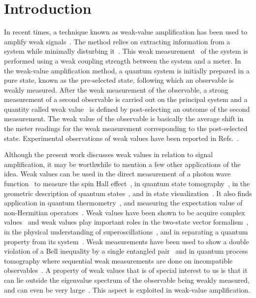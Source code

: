 \documentclass[aps,pra,showpacs,twoside,twocolumn,10pt]{revtex4-1}
\begin{document}
\section{Introduction}
In recent times, a technique known as weak-value amplification has been 
used to amplify 
weak signals~\cite{U}. The method relies on extracting information from a system while minimally disturbing it~\cite{Barchielli1982, Busch1984, Caves1986}.  This weak measurement~\cite{AAV, Duck} of the system is performed using a weak coupling strength between the system and a meter.
 In the weak-value amplification method, a quantum system is initially prepared in a pure state, known as the pre-selected state, following which an observable is weakly measured. After the weak measurement of the observable, a strong measurement of a second observable is carried out on the principal system and a quantity called weak value~\cite{AAV,Duck,YA} is defined by post-selecting an outcome of the second measurement. The weak value of the observable is basically the average shift in the meter readings for the weak measurement corresponding to the post-selected state. Experimental observations of weak values have been reported in Refs.~\cite{Correa, Denkmayr, Sponar, Ashby, Pryde, Hosten, Lundeen, Cormann}.


Although the present work discusses weak values in relation to signal amplification, it may be worthwhile to mention a few other applications of the idea.
Weak values can be used in the direct measurement of a photon wave function~\cite{Lundeen, L2} to measure the spin Hall effect~\cite{Hosten}, in quantum state tomography~\cite{tomo1, tomo2}, in the geometric description of quantum states~\cite{geometry}, and in state visualization~\cite{sv}. It also finds application in quantum thermometry~\cite{qt}, and measuring the expectation value of non-Hermitian operators~\cite{nonherm1, nonherm2}. 
Weak values have been shown to be acquire complex values~\cite{Jozsa} and weak values play important roles in the two-state vector formalism~\cite{twostate}, in the physical understanding of superoscillations~\cite{Super}, and in separating a quantum property from its system~\cite{Aharonov}. Weak measurements have been used to show a double violation of a Bell inequality by a single entangled pair~\cite{npj} and in quantum process tomography where sequential weak measurements are done on incompatible observables~\cite{m}.
A property of weak values that is of special interest to us is that it can lie outside the eigenvalue spectrum of the observable being weakly measured,  and can even be very large~\cite{AAV, Duck}. This aspect is exploited in weak-value amplification.
\end{document}
